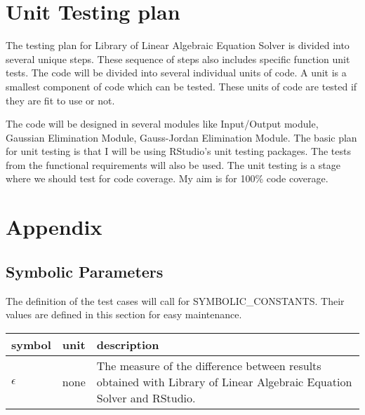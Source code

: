 \documentclass[12pt, titlepage]{article}
\begin{document}
\section{Unit Testing plan}



The testing plan for Library of Linear Algebraic Equation Solver is divided into
several unique steps. These sequence of steps also includes specific function
unit tests. The code will be divided into several individual units of code. A
unit is a smallest component of code which can be tested. These units of code
are tested if they are fit to use or not.

The code will be designed in several modules like Input/Output module, Gaussian
Elimination Module, Gauss-Jordan Elimination Module. The basic plan for unit
testing is that I will be using RStudio's unit testing packages. The tests from
the functional requirements will also be used. The unit testing is a stage where
we should test for code coverage. My aim is for 100\% code coverage.








\newpage

\section{Appendix}



\subsection{Symbolic Parameters}

The definition of the test cases will call for SYMBOLIC\_CONSTANTS.
Their values are defined in this section for easy maintenance.

\renewcommand{\arraystretch}{1.2}
\noindent \begin{longtable*}{l l p{12cm}} \toprule
\textbf{symbol} & \textbf{unit} & \textbf{description}\\
\midrule

$\epsilon$ & none & The measure of the difference between results obtained with
Library of Linear Algebraic Equation Solver and RStudio.\\

\bottomrule
\end{longtable*}
\end{document}
